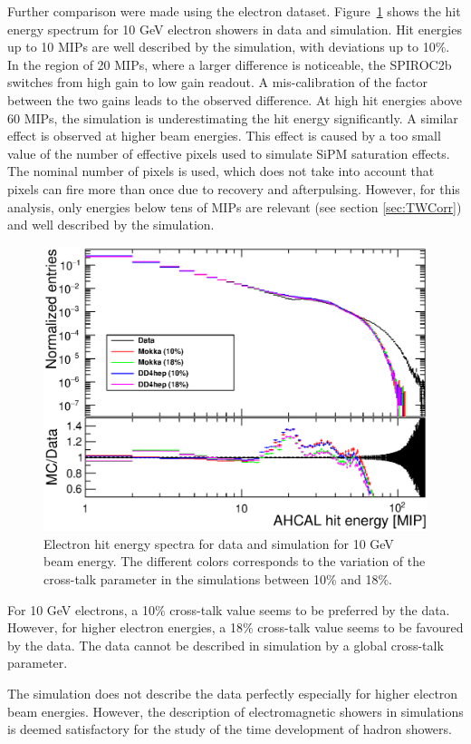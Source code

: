 \documentclass{JINST}
\begin{document}
Further comparison were made using the electron dataset. Figure~\ref{fig:HitEnergy10GeVe} shows the hit energy spectrum for 10 GeV electron showers in data and simulation. Hit energies up to 10 MIPs are well described by the simulation, with deviations up to 10\%. In the region of 20 MIPs, where a larger difference is noticeable, the SPIROC2b switches from high gain to low gain readout. A mis-calibration of the factor between the two gains leads to the observed difference. At high hit energies above 60 MIPs, the simulation is underestimating the hit energy significantly. A similar effect is observed at higher beam energies. This effect is caused by a too small value of the number of effective pixels used to simulate SiPM saturation effects. The nominal number of pixels is used, which does not take into account that pixels can fire more than once due to recovery and afterpulsing. However, for this analysis, only energies below tens of MIPs are relevant (see section \ref{sec:TWCorr}) and well described by the simulation.

\begin{figure}[htbp!]
  \centering
  \includegraphics[width=0.7\linewidth]{fig/HitEnergy_Electrons10GeV.eps}
  \caption{Electron hit energy spectra for data and simulation for 10 GeV beam energy. The different colors corresponds to the variation of the cross-talk parameter in the simulations between 10\% and 18\%.} \label{fig:HitEnergy10GeVe}
\end{figure}

For 10 GeV electrons, a 10\% cross-talk value seems to be preferred by the data. However, for higher electron energies, a 18\% cross-talk value seems to be favoured by the data. The data cannot be described in simulation by a global cross-talk parameter.

The simulation does not describe the data perfectly especially for higher electron beam energies. However, the description of electromagnetic showers in simulations is deemed satisfactory for the study of the time development of hadron showers.
\end{document}
